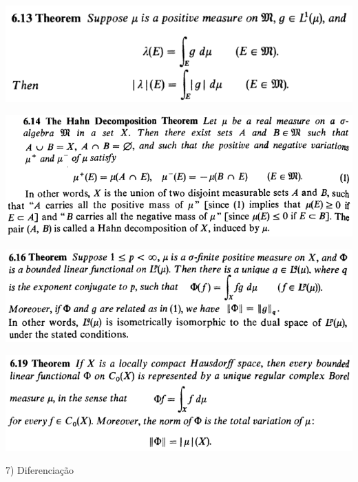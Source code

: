 \documentclass[12pt]{article}
\begin{document}
		\begin{center}
		\includegraphics{6ponto13}
		\end{center}

		\begin{center}
		\includegraphics[scale=0.9]{6ponto14}
		\end{center}

		\begin{center}
		\includegraphics{6ponto16}
		\end{center}

		\begin{center}
		\includegraphics{6ponto19}
		\end{center}

\vspace{3mm}

7) Diferencia\c{c}\~ao

\vspace{3mm}
\end{document}
